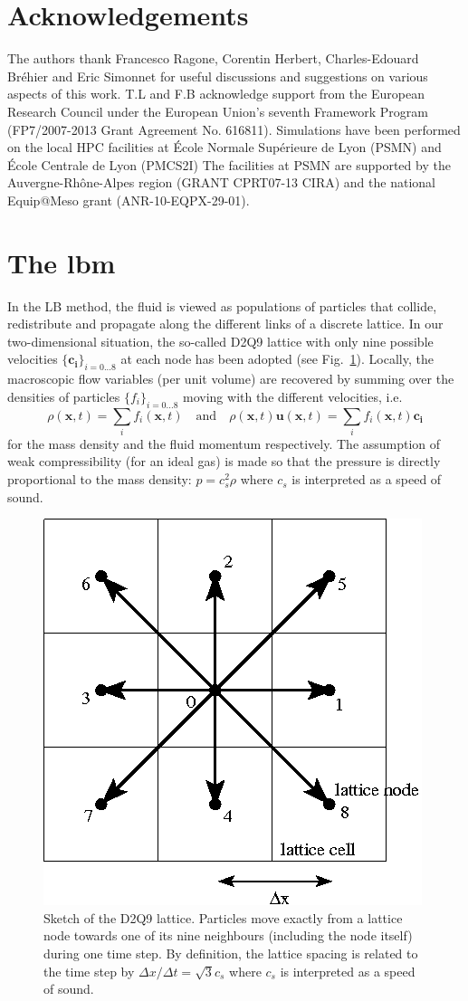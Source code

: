 \documentclass[pre,aps,floatfix,10pt,superscriptaddress, notitlepage,preprint]{revtex4-1}
\begin{document}
\section{Acknowledgements}
The authors thank Francesco Ragone, Corentin Herbert, Charles-Edouard Bréhier and Eric Simonnet for useful discussions and suggestions on various aspects of this work.
T.L and F.B acknowledge support from the European Research Council under the European Union's seventh Framework Program (FP7/2007-2013 Grant Agreement No. 616811).
Simulations have been performed on the local HPC facilities at École Normale Supérieure de Lyon (PSMN) and École Centrale de Lyon (PMCS2I)
The facilities at PSMN are supported by the Auvergne-Rhône-Alpes region (GRANT CPRT07-13 CIRA) and the national Equip@Meso grant (ANR-10-EQPX-29-01).

\appendix*
\section{The \acl{lbm}}
\label{sec:lbm}

In the LB method, the fluid is viewed as populations of particles that collide, redistribute and propagate along the different links of a discrete lattice. 
In our two-dimensional situation, the so-called D2Q9 lattice with only nine possible velocities $\{\mathbf{c_i}\}_{i=0...8}$ at each node has been adopted (see  Fig.~\ref{fig:D2Q9}).
Locally, the macroscopic flow variables (per unit volume) are recovered by summing over the densities of particles $\{f_i\}_{i=0...8}$ moving with the different velocities, i.e.
\[
\rho(\mathbf{x},t) = \sum_i f_i(\mathbf{x},t) \quad \mathrm{and}\quad \rho(\mathbf{x},t) \mathbf u(\mathbf{x},t) = \sum_i f_i(\mathbf{x},t) \mathbf{c_i}
\]
for the mass density and the fluid momentum respectively. The assumption of weak compressibility (for an ideal gas) is made so that the pressure is directly proportional to the mass density: $p = c_s^2 \rho$ where $c_s$ is interpreted as a speed of sound.  

\begin{figure}
	\centering
	\includegraphics[width=0.3\linewidth]{D2Q9/D2Q9}
	\caption{Sketch of the D2Q9 lattice. Particles move exactly from a lattice node towards one of its nine neighbours (including the node itself) during one time step. By definition, the lattice spacing is related to the time step by $\Delta x/ \Delta t = \sqrt{3} c_s$ where $c_s$ is interpreted as a speed of sound.}
	\label{fig:D2Q9}
\end{figure}
\end{document}
